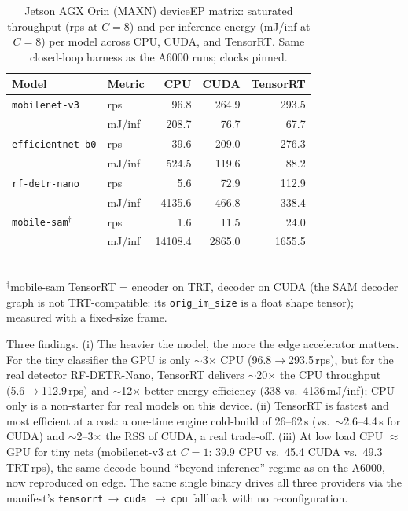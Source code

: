 \begin{table}[t]
  \centering
  \small
  \caption{%
    Jetson AGX Orin (MAXN) device\texttimes EP matrix: saturated throughput (rps at $C{=}8$) and
    per-inference energy (mJ/inf at $C{=}8$) per model across CPU, CUDA, and TensorRT.  Same
    closed-loop harness as the A6000 runs; clocks pinned.%
  }
  \label{tab:edge}
  \begin{tabular}{llrrr}
    \toprule
    \textbf{Model} & \textbf{Metric} & \textbf{CPU} & \textbf{CUDA} & \textbf{TensorRT} \\
    \midrule
    \texttt{mobilenet-v3}    & rps    & 96.8   & 264.9 & 293.5 \\
                             & mJ/inf & 208.7  & 76.7  & 67.7  \\
    \texttt{efficientnet-b0} & rps    & 39.6   & 209.0 & 276.3 \\
                             & mJ/inf & 524.5  & 119.6 & 88.2  \\
    \texttt{rf-detr-nano}    & rps    & 5.6    & 72.9  & 112.9 \\
                             & mJ/inf & 4135.6 & 466.8 & 338.4 \\
    \texttt{mobile-sam}$^{\dagger}$ & rps & 1.6 & 11.5  & 24.0  \\
                             & mJ/inf & 14108.4 & 2865.0 & 1655.5 \\
    \bottomrule
  \end{tabular}
  \\[2pt]
  {\footnotesize $^{\dagger}$mobile-sam TensorRT = encoder on TRT, decoder on CUDA (the SAM
  decoder graph is not TRT-compatible: its \texttt{orig\_im\_size} is a float shape tensor);
  measured with a fixed-size frame.}
\end{table}

Three findings.  (i) The heavier the model, the more the edge accelerator matters.  For
the tiny classifier the GPU is only $\sim$3$\times$ CPU (96.8$\to$293.5\,rps), but for the real
detector RF-DETR-Nano, TensorRT delivers $\sim$20$\times$ the CPU throughput (5.6$\to$112.9\,rps)
and $\sim$12$\times$ better energy efficiency (338 vs.\ 4136\,mJ/inf); CPU-only is a non-starter
for real models on this device.  (ii) TensorRT is fastest and most efficient at a cost: a
one-time engine cold-build of 26--62\,s (vs.\ $\sim$2.6--4.4\,s for CUDA) and $\sim$2--3$\times$
the RSS of CUDA, a real trade-off.  (iii) At low load CPU $\approx$ GPU for tiny
nets (mobilenet-v3 at $C{=}1$: 39.9 CPU vs.\ 45.4 CUDA vs.\ 49.3 TRT\,rps), the same
decode-bound ``beyond inference'' regime as on the A6000, now reproduced on edge.  The same
single binary drives all three providers via the manifest's \texttt{tensorrt}\,$\to$\,\texttt{cuda}
\,$\to$\,\texttt{cpu} fallback with no reconfiguration.

